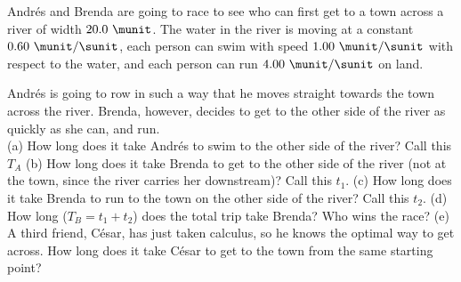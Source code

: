 Andr\'es and Brenda are going to race to see who can first get to a
town across a river of width $20.0\ \munit$. The water in the river is
moving at a constant $0.60\ \munit/\sunit$, each person can swim with
speed $1.00\ \munit/\sunit$ with respect to the water, and each
person can run $4.00\ \munit/\sunit$ on land.

Andr\'es is going to row in such a way that he moves straight towards
the town across the river. Brenda, however, decides to get to the
other side of the river as quickly as she can, and run.\\
%
(a) How long does it take Andr\'es to swim to the other side of the
river? Call this $T_A$\answercheck\hwendpart
%
(b) How long does it take Brenda to get to the other side of the river
(not at the town, since the river carries her downstream)? Call this
$t_1$.\answercheck\hwendpart
%
(c) How long does it take Brenda to run to the town on the other side
of the river? Call this $t_2$.\answercheck\hwendpart
%
(d) How long ($T_B = t_1 + t_2$) does the total trip take Brenda? Who
wins the race?\answercheck\hwendpart
%
(e) A third friend, C\'esar, has just taken calculus, so he
knows the optimal way to get across. How
long does it take C\'esar to get to the town from the same starting
point?\answercheck
